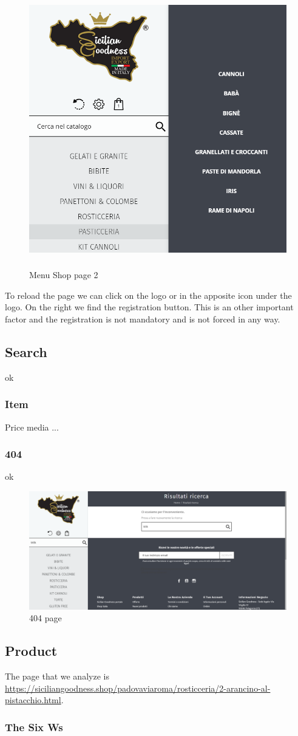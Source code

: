 \begin{figure}[H]
	\centering\includegraphics[height=12cm, width=12 cm]{Img/menushop2.png}
	\caption{Menu Shop page 2}
\end{figure}

To reload the page we can click on the logo or in the apposite icon under the logo.
On the right we find the registration button. 
This is an other important factor and the registration is not mandatory and is not forced in any way.

\subsection{Search}
ok
\subsubsection{Item}
Price 
media
...

\subsubsection{404}
ok

\begin{figure}[H]
	\centering\includegraphics[width=12cm]{Img/404.png}
	\caption{404 page}
\end{figure}

\subsection{Product}
The page that we analyze is \url{https://siciliangoodness.shop/padovaviaroma/rosticceria/2-arancino-al-pistacchio.html}.

\subsubsection{The Six Ws}

\pagebreak